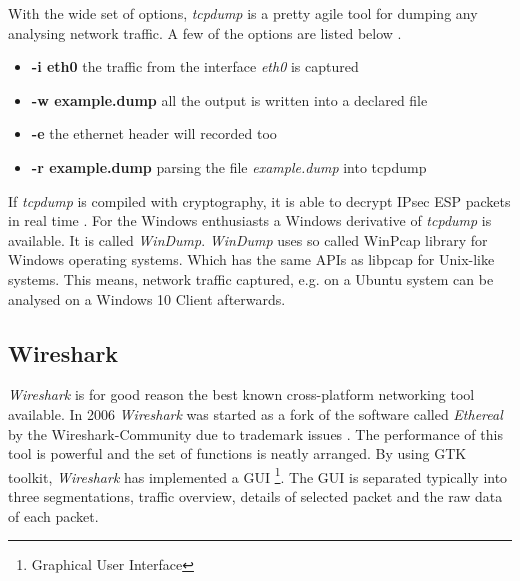 \documentclass[conference]{IEEEtran}
\begin{document}
With the wide set of options, \textit{tcpdump} is a pretty agile tool for dumping any analysing network traffic. A few of the options are listed below \cite{tcpdumporg}. 

\begin{itemize}
\item \textbf{-i eth0} the traffic from the interface \textit{eth0} is captured
\item \textbf{-w example.dump} all the output is written into a declared file
\item \textbf{-e} the ethernet header will recorded too
\item \textbf{-r example.dump} parsing the file \textit{example.dump} into tcpdump
\end{itemize}

If \textit{tcpdump} is compiled with cryptography, it is able to decrypt IPsec ESP packets in real time \cite{goyal2017}.
For the Windows enthusiasts a Windows derivative of \textit{tcpdump} is available. It is called \textit{WinDump}. \textit{WinDump} uses so called WinPcap library for Windows operating systems.  Which has the same APIs as libpcap for Unix-like systems. This means, network traffic captured, e.g. on a Ubuntu system can be analysed on a Windows 10 Client afterwards.

\subsection*{Wireshark}

\textit{Wireshark} is for good reason the best known cross-platform networking tool available. In 2006 \textit{Wireshark} was started as a fork of the software called \textit{Ethereal} by the Wireshark-Community due to trademark issues \cite{asrodiapatel2012}.  The performance of this tool is powerful and the set of functions is neatly arranged. By using GTK toolkit, \textit{Wireshark} has implemented a GUI \footnote{Graphical User Interface}\cite{suribatra2012}. The GUI is separated typically into three segmentations, traffic overview, details of selected packet and the raw data of each packet.
\end{document}
